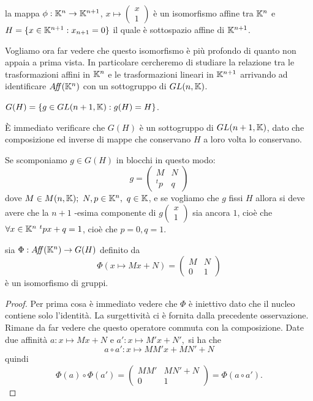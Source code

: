 \begin{remark}
 la mappa $\phi:\mathbb K^n\rightarrow \mathbb K^{n+1}$, $x\mapsto
 \left(\begin{smallmatrix}
	x \\
	1
	\end{smallmatrix}\right)$
è un isomorfismo affine tra $\mathbb K^n$ e
$H=\{x\in \mathbb K^{n+1} : x_{n+1}=0\}$ il quale è sottospazio affine di $\mathbb K^{n+1}$.
 \end{remark}
 
 Vogliamo ora far vedere che questo isomorfismo è più profondo di quanto non appaia a prima vista. In particolare cercheremo di studiare
 la relazione tra le trasformazioni affini in $\mathbb K^n$ e le trasformazioni lineari in $\mathbb K^{n+1}$ arrivando ad identificare
 $A\!f\!\!f(\mathbb K^n)$ con un sottogruppo di $GL(n,\mathbb K)$.
 
 \begin{definition}
  $G(H)=\{g\in GL(n+1,\mathbb K):g(H)=H\}$.
 \end{definition}
 
 \begin{remark}
 \`E immediato verificare che  $G(H)$ è un sottogruppo di  $GL(n+1,\mathbb K)$,
 dato che composizione ed inverse di mappe che conservano $H$ a loro volta lo conservano.
 \end{remark}
 
 \begin{remark}
 Se scomponiamo  $g\in G(H)$ in blocchi in questo modo:
 \[
	g = \left(
		\begin{array}{cc}
		M & N \\ 
		^tp & q
		\end{array}
	\right)
 \]
  dove $M\in M(n,\mathbb K);\  N,p\in \mathbb K^n,\ q \in \mathbb K$, e se vogliamo che  $g$ fissi $H$
 allora si deve avere che la $n+1$ -esima componente di
 $g\left(\begin{smallmatrix}
	x \\
	1
	\end{smallmatrix}
	\right)$
 sia ancora $1$,
 cioè che  $\forall x\in \mathbb K^n\  ^tpx+q=1$, cioè che $p=0, q=1$.
 \end{remark}
 
 \begin{proposition}
 sia  $\Phi:A\!f\!\!f(\mathbb K^n)\rightarrow G(H)$ definito da
 \[
	\Phi(x\mapsto Mx+N)=\left(
		\begin{array}{cc}
		M & N \\ 
		0 & 1
		\end{array}
	\right)
 \]
 è un isomorfismo di gruppi.
 \end{proposition}
 
 \begin{proof}
 Per prima cosa è immediato vedere che $\Phi$  è iniettivo dato che il nucleo contiene solo l'identità.
 La surgettività ci è fornita dalla precedente osservazione. Rimane da far vedere che questo operatore commuta con la composizione.
 Date due affinità $a:x\mapsto Mx+N$ e $a':x\mapsto M'x+N',$ si ha che
 \[
	a\circ a':x\mapsto MM'x+ MN'+N
 \]
 quindi
 \[
	\Phi(a)\circ\Phi(a')=\left(
		\begin{array}{cc}
		MM' & MN'+N \\ 
		0 & 1
		\end{array}
	\right)=\Phi(a\circ a').
 \]
 \end{proof}
 